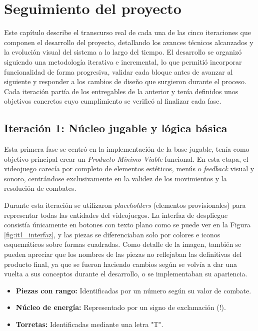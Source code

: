 \chapter{Seguimiento del proyecto}

Este capítulo describe el transcurso real de cada una de las cinco iteraciones que componen el desarrollo del proyecto, detallando los avances técnicos alcanzados y la evolución visual del sistema a lo largo del tiempo. El desarrollo se organizó siguiendo una metodología iterativa e incremental, lo que permitió incorporar funcionalidad de forma progresiva, validar cada bloque antes de avanzar al siguiente y responder a los cambios de diseño que surgieron durante el proceso. Cada iteración partía de los entregables de la anterior y tenía definidos unos objetivos concretos cuyo cumplimiento se verificó al finalizar cada fase.

\section{Iteración 1: Núcleo jugable y lógica básica}

Esta primera fase se centró en la implementación de la base jugable, tenía como objetivo principal crear un \textit{Producto Mínimo Viable} funcional. En esta etapa, el videojuego carecía por completo de elementos estéticos, menús o \textit{feedback} visual y sonoro, centrándose exclusivamente en la validez de los movimientos y la resolución de combates.

Durante esta iteración se utilizaron \textit{placeholders} (elementos provisionales) para representar todas las entidades del videojuegos. La interfaz de despliegue consistía únicamente en botones con texto plano como se puede ver en la Figura \ref{fig:it1_interfaz}, y las piezas se diferenciaban solo por colores e iconos esquemáticos sobre formas cuadradas. Como detalle de la imagen, también se pueden apreciar que los nombres de las piezas no reflejaban las definitivas del producto final, ya que se fueron haciendo cambios según se volvía a dar una vuelta a sus conceptos durante el desarrollo, o se implementaban su apariencia.

\begin{itemize}
	\item \textbf{Piezas con rango:} Identificadas por un número según su valor de combate.
	\item \textbf{Núcleo de energía:} Representado por un signo de exclamación (!).
	\item \textbf{Torretas:} Identificadas mediante una letra "T".
\end{itemize}

